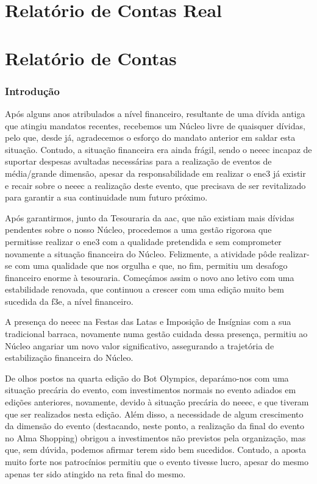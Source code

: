
{ %
    \part{Relatório de Contas Real}
}
{ %
    \part{Relatório de Contas}
}

\section{Introdução}

Após alguns anos atribulados a nível financeiro, resultante de uma dívida antiga que atingiu mandatos recentes, recebemos um Núcleo livre de quaisquer dívidas, pelo que, desde já, agradecemos o esforço do mandato anterior em saldar esta situação. Contudo, a situação financeira era ainda frágil, sendo o \acrshort{neeec} incapaz de suportar despesas avultadas necessárias para a realização de eventos de média/grande dimensão, apesar da responsabilidade em realizar o \acrfull{ene3} já existir e recair sobre o \acrshort{neeec} a realização deste evento, que precisava de ser revitalizado para garantir a sua continuidade num futuro próximo.

Após garantirmos, junto da Tesouraria da \acrshort{aac}, que não existiam mais dívidas pendentes sobre o nosso Núcleo, procedemos a uma gestão rigorosa que permitisse realizar o \acrshort{ene3} com a qualidade pretendida e sem comprometer novamente a situação financeira do Núcleo. Felizmente, a atividade pôde realizar-se com uma qualidade que nos orgulha e que, no fim, permitiu um desafogo financeiro enorme à tesouraria. Começámos assim o novo ano letivo com uma estabilidade renovada, que continuou a crescer com uma edição muito bem sucedida da \acrfull{f3e}, a nível financeiro.

A presença do \acrshort{neeec} na Festas das Latas e Imposição de Insígnias com a sua tradicional barraca, novamente numa gestão cuidada dessa presença, permitiu ao Núcleo angariar um novo valor significativo, assegurando a trajetória de estabilização financeira do Núcleo.

De olhos postos na quarta edição do Bot Olympics, deparámo-nos com uma situação precária do evento, com investimentos normais no evento adiados em edições anteriores, novamente, devido à situação precária do \acrshort{neeec}, e que tiveram que ser realizados nesta edição. Além disso, a necessidade de algum crescimento da dimensão do evento (destacando, neste ponto, a realização da final do evento no Alma Shopping) obrigou a investimentos não previstos pela organização, mas que, sem dúvida, podemos afirmar terem sido bem sucedidos. Contudo, a aposta muito forte nos patrocínios permitiu que o evento tivesse lucro, apesar do mesmo apenas ter sido atingido na reta final do mesmo.

